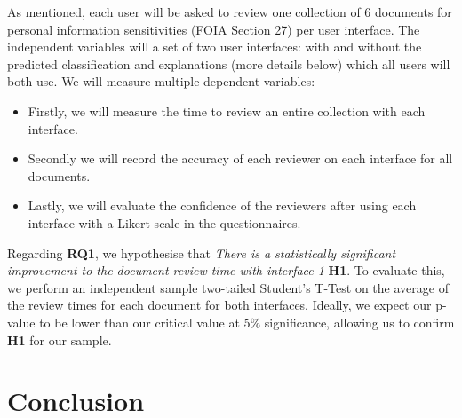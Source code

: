 \documentclass{l4proj}
\begin{document}
As mentioned, each user will be asked to review one collection of 6 documents for personal information sensitivities (FOIA Section 27) per user interface.
The independent variables will a set of two user interfaces: with and without the predicted classification and explanations (more details below) which all users will both use. We will measure multiple dependent variables:

\begin{itemize}
    \item Firstly, we will measure the time to review an entire collection with each interface.
    \item Secondly we will record the accuracy of each reviewer on each interface for all documents.
    \item Lastly, we will evaluate the confidence of the reviewers after using each interface with a Likert scale in the questionnaires.
\end{itemize}

Regarding \textbf{RQ1}, we hypothesise that \textit{There is a statistically significant improvement to the document review time with interface 1} \textbf{H1}.
To evaluate this, we perform an independent sample two-tailed Student's T-Test on the average of the review times for each document for both interfaces.
Ideally, we expect our p-value to be lower than our critical value at 5\% significance, allowing us to confirm \textbf{H1} for our sample.




\chapter{Conclusion}



%
% 
\end{document}
